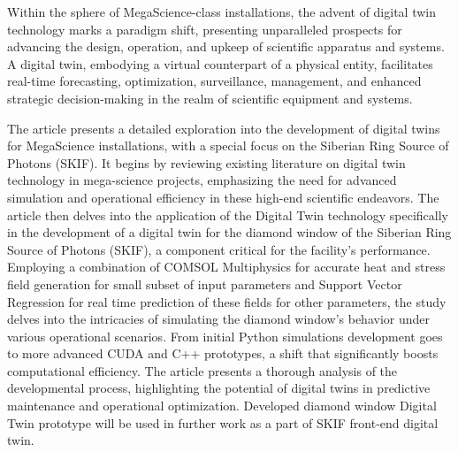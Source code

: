 Within the sphere of MegaScience-class installations, the advent of digital
twin technology marks a paradigm shift, presenting unparalleled prospects for
advancing the design, operation, and upkeep of scientific apparatus and
systems. A digital twin, embodying a virtual counterpart of a physical entity,
facilitates real-time forecasting, optimization, surveillance, management, and
enhanced strategic decision-making in the realm of scientific equipment and
systems.

The article presents a detailed exploration into the development of digital
twins for MegaScience installations, with a special focus on the Siberian Ring
Source of Photons (SKIF). It begins by reviewing existing literature on digital
twin technology in mega-science projects, emphasizing the need for advanced
simulation and operational efficiency in these high-end scientific endeavors.
The article then delves into the application of the Digital Twin technology
specifically in the development of a digital twin for the diamond window of the
Siberian Ring Source of Photons (SKIF), a component critical for the facility's
performance. Employing a combination of COMSOL Multiphysics for accurate heat
and stress field generation for small subset of input parameters and Support
Vector Regression for real time prediction of these fields for other
parameters, the study delves into the intricacies of simulating the diamond
window's behavior under various operational scenarios. From initial Python
simulations development goes to more advanced CUDA and C++ prototypes, a shift that
significantly boosts computational efficiency. The article presents a thorough
analysis of the developmental process, highlighting the potential of digital
twins in predictive maintenance and operational optimization. Developed diamond
window Digital Twin prototype will be used in further work as a part of SKIF
front-end digital twin.

